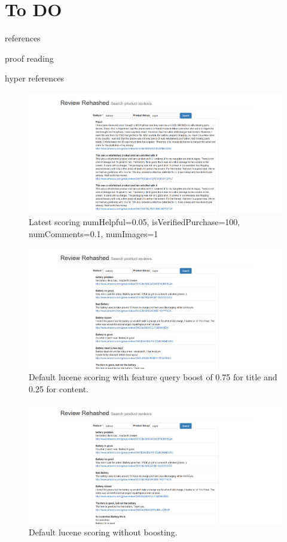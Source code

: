 \documentclass{article}
\begin{document}
\section{To DO}
\begin{description}
\item references
\item proof reading
\item hyper references

\begin{figure}[ht!]
  \centering
  \includegraphics[width=1\textwidth]{scoring_piecewise_normalization}
  \caption{Latest scoring numHelpful=0.05, isVerifiedPurchase=100, numComments=0.1, numImages=1~\label{fig:Search_Engine}}
\end{figure}

\begin{figure}[ht!]
  \centering
  \includegraphics[width=1\textwidth]{noscoring}
  \caption{Default lucene scoring with feature query boost of 0.75 for title and 0.25 for content.~\label{fig:Search_Engine}}
\end{figure}

\begin{figure}[ht!]
  \centering
  \includegraphics[width=1\textwidth]{noboosting}
  \caption{Default lucene scoring without boosting.~\label{fig:Search_Engine}}
\end{figure}


\end{description}
\end{document}

